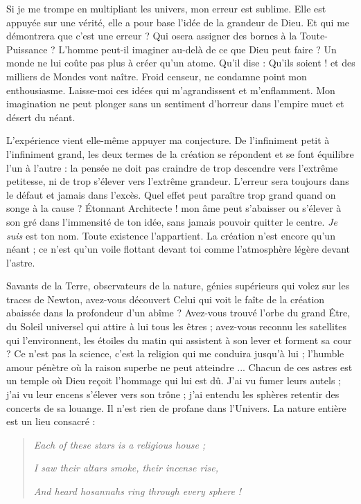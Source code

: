 \documentclass[a4paper, 11pt, oneside]{article}
\begin{document}
Si je me trompe en multipliant les univers, mon erreur est sublime. Elle est appuyée sur une vérité, elle a pour base l'idée de la grandeur de Dieu. Et qui me démontrera que c'est une erreur ? Qui osera assigner des bornes à la Toute-Puissance ? L'homme peut-il imaginer au-delà de ce que Dieu peut faire ? Un monde ne lui coûte pas plus à créer qu'un atome. Qu'il dise : Qu'ils soient ! et des milliers de Mondes vont naître. Froid censeur, ne condamne point mon enthousiasme. Laisse-moi ces idées qui m'agrandissent et m'enflamment. Mon imagination ne peut plonger sans un sentiment d'horreur dans l'empire muet et désert du néant.

L'expérience vient elle-même appuyer ma conjecture. De l'infiniment petit à l'infiniment grand, les deux termes de la création se répondent et se font équilibre l'un à l'autre : la pensée ne doit pas craindre de trop descendre vers l'extrême petitesse, ni de trop s'élever vers l'extrême grandeur. L'erreur sera toujours dans le défaut et jamais dans l'excès. Quel effet peut paraître trop grand quand on songe à la cause ? Étonnant Architecte ! mon âme peut s'abaisser ou s'élever à son gré dans l'immensité de ton idée, sans jamais pouvoir quitter le centre. \emph{Je suis} est ton nom. Toute existence l'appartient. La création n'est encore qu'un néant ; ce n'est qu'un voile flottant devant toi comme l'atmosphère légère devant l'astre.

Savants de la Terre, observateurs de la nature, génies supérieurs qui volez sur les traces de Newton, avez-vous découvert Celui qui voit le faîte de la création abaissée dans la profondeur d'un abîme ? Avez-vous trouvé l'orbe du grand Être, du Soleil universel qui attire à lui tous les êtres ; avez-vous reconnu les satellites qui l'environnent, les étoiles du matin qui assistent à son lever et forment sa cour ? Ce n'est pas la science, c'est la religion qui me conduira jusqu'à lui ; l'humble amour pénètre où la raison superbe ne peut atteindre ... Chacun de ces astres est un temple où Dieu reçoit l'hommage qui lui est dû. J'ai vu fumer leurs autels ; j'ai vu leur encens s'élever vers son trône ; j'ai entendu les sphères retentir des concerts de sa louange. Il n'est rien de profane dans l'Univers. La nature entière est un lieu consacré :
\begin{quotation}
\emph{Each of these stars is a religious house ;}

\emph{I saw their altars smoke, their incense rise,}

\emph{And heard hosannahs ring through every sphere !}
\end{quotation}
\end{document}
